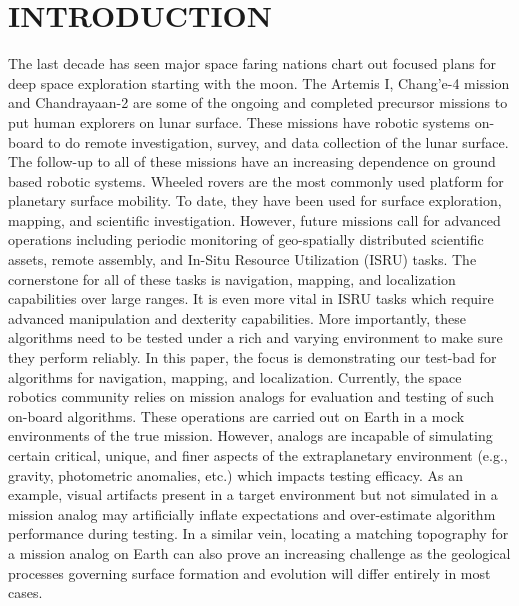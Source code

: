 \documentclass[a4paper, 10pt, conference]{ieeeconf}      %
\begin{document}
\section{INTRODUCTION}

The last decade has seen major space faring nations chart out focused plans for deep space exploration starting with the moon. The Artemis I\cite{sundahl2020setting},  Chang'e-4 mission\cite{jia2018scientific} and Chandrayaan-2\cite{sundararajan2018overview} are some of the ongoing and completed precursor missions to put human explorers on lunar surface. These missions have robotic systems on-board to do remote investigation, survey, and data collection of the lunar surface. The follow-up to all of these missions have an increasing dependence on ground based robotic systems. Wheeled rovers are the most commonly used platform for planetary surface mobility. To date, they have been used for surface exploration, mapping, and scientific investigation. However, future missions call for advanced operations including periodic monitoring of geo-spatially distributed scientific assets, remote assembly, and In-Situ Resource Utilization (ISRU)\cite{green2019situ} tasks. The cornerstone for all of these tasks is navigation, mapping, and localization capabilities over large ranges. It is even more vital in ISRU tasks which require advanced manipulation and dexterity capabilities. More importantly, these algorithms need to be tested under a rich and varying environment to make sure they perform reliably. In this paper, the focus is demonstrating our test-bad for algorithms for navigation, mapping, and localization. Currently, the space robotics community relies on mission analogs for evaluation and testing of such on-board algorithms. These operations are carried out on Earth in a mock environments of the true mission. However, analogs are incapable of simulating certain critical, unique, and finer aspects of the extraplanetary environment (e.g., gravity, photometric anomalies, etc.) which impacts testing efficacy. As an example, visual artifacts present in a target environment but not simulated in a mission analog may artificially inflate expectations and over-estimate algorithm performance during testing. In a similar vein, locating a matching topography for a mission analog on Earth can also prove an increasing challenge as the geological processes governing surface formation and evolution will differ entirely in most cases.    
\end{document}
